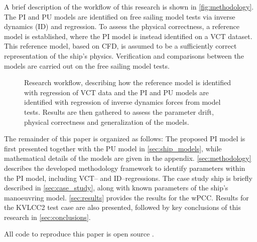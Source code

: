 A brief description of the workflow of this research is shown in \autoref{fig:methodology}.
The PI and PU models are identified on free sailing model tests \citep{alexandersson_system_2022,alexandersson_wpcc_2024} via inverse dynamics (ID) and regression. To assess the physical correctness, a reference model is established, where the PI model is instead identified on a VCT dataset. This reference model, based on CFD, is assumed to be a sufficiently correct representation of the ship's physics.
Verification and comparisons between the models are carried out on the free sailing model tests.
%
\begin{figure}[h]
  \centering
  
  \caption{Research workflow, describing how the reference model is identified with regression of VCT data and the PI and PU models are identified with regression of inverse dynamics forces from model tests. Results are then gathered to assess the parameter drift, physical correctness and generalization of the models.}
  \label{fig:methodology}
\end{figure}

The remainder of this paper is organized as follows: The proposed PI model is first presented together with the PU 
 model in \autoref{sec:ship_models}, while mathematical details of the models are given in the appendix. 
\autoref{sec:methodology} describes the developed methodology framework to identify parameters within the PI model, including VCT-- and ID--regressions. The case study ship is briefly described in \autoref{sec:case_study}, along with known parameters of the ship’s manoeuvring model. \autoref{sec:results} provides the results for the wPCC. Results for the KVLCC2 test case are also presented, followed by key conclusions of this research in \autoref{sec:conclusions}.

All code to reproduce this paper is open source \cite{alexanderssonCodePaperSystem2024}.